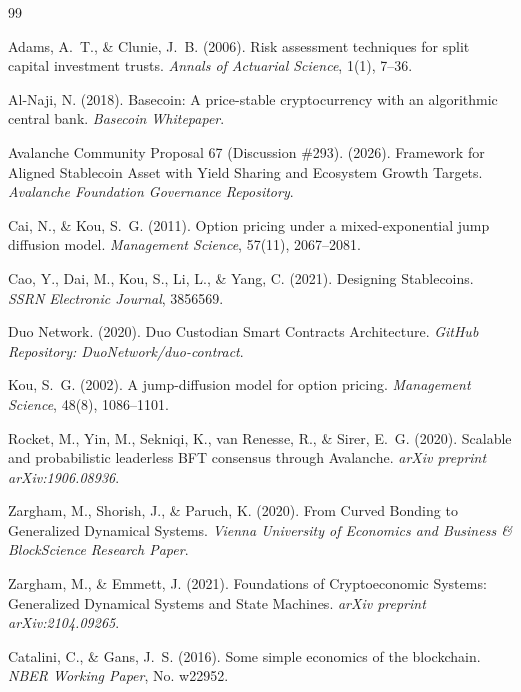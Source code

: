 \documentclass[11pt,a4paper]{article}
\begin{document}
\begin{thebibliography}{99}

Adams, A.~T., \& Clunie, J.~B. (2006).
\newblock Risk assessment techniques for split capital investment trusts.
\newblock \textit{Annals of Actuarial Science}, 1(1), 7--36.

Al-Naji, N. (2018).
\newblock Basecoin: A price-stable cryptocurrency with an algorithmic central bank.
\newblock \textit{Basecoin Whitepaper}.

Avalanche Community Proposal 67 (Discussion \#293). (2026).
\newblock Framework for Aligned Stablecoin Asset with Yield Sharing and Ecosystem Growth Targets.
\newblock \textit{Avalanche Foundation Governance Repository}.

Cai, N., \& Kou, S.~G. (2011).
\newblock Option pricing under a mixed-exponential jump diffusion model.
\newblock \textit{Management Science}, 57(11), 2067--2081.

Cao, Y., Dai, M., Kou, S., Li, L., \& Yang, C. (2021).
\newblock Designing Stablecoins.
\newblock \textit{SSRN Electronic Journal}, 3856569.

Duo Network. (2020).
\newblock Duo Custodian Smart Contracts Architecture.
\newblock \textit{GitHub Repository: DuoNetwork/duo-contract}.

Kou, S.~G. (2002).
\newblock A jump-diffusion model for option pricing.
\newblock \textit{Management Science}, 48(8), 1086--1101.

Rocket, M., Yin, M., Sekniqi, K., van Renesse, R., \& Sirer, E.~G. (2020).
\newblock Scalable and probabilistic leaderless BFT consensus through Avalanche.
\newblock \textit{arXiv preprint arXiv:1906.08936}.

Zargham, M., Shorish, J., \& Paruch, K. (2020).
\newblock From Curved Bonding to Generalized Dynamical Systems.
\newblock \textit{Vienna University of Economics and Business \& BlockScience Research Paper}.

Zargham, M., \& Emmett, J. (2021).
\newblock Foundations of Cryptoeconomic Systems: Generalized Dynamical Systems and State Machines.
\newblock \textit{arXiv preprint arXiv:2104.09265}.

Catalini, C., \& Gans, J.~S. (2016).
\newblock Some simple economics of the blockchain.
\newblock \textit{NBER Working Paper}, No. w22952.


\end{thebibliography}
\end{document}
